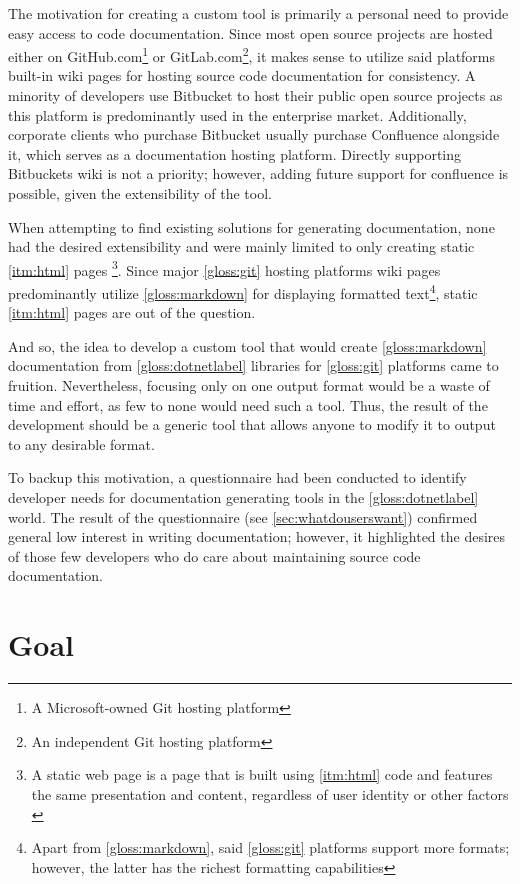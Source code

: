 The motivation for creating a custom tool is primarily a personal need to provide easy access to code documentation. Since most open source projects are hosted either on GitHub.com\footnote{A Microsoft-owned Git hosting platform} or GitLab.com\footnote{An independent Git hosting platform}, it makes sense to utilize said platforms built-in wiki pages for hosting source code documentation for consistency. A minority of developers use Bitbucket to host their public open source projects as this platform is predominantly used in the enterprise market. Additionally, corporate clients who purchase Bitbucket usually purchase Confluence alongside it, which serves as a documentation hosting platform. Directly supporting Bitbuckets wiki is not a priority; however, adding future support for confluence is possible, given the extensibility of the tool.

When attempting to find existing solutions for generating documentation, none had the desired extensibility and were mainly limited to only creating static \ref{itm:html} pages
\footnote{A static web page is a page that is built using \ref{itm:html} code and features the same presentation and content, regardless of user identity or other factors \cite{techopedia_what_2017}}.
Since major \ref{gloss:git} hosting platforms wiki pages predominantly utilize \ref{gloss:markdown} for displaying formatted text\footnote{Apart from \ref{gloss:markdown}, said \ref{gloss:git} platforms support more formats; however, the latter has the richest formatting capabilities}, static \ref{itm:html} pages are out of the question.

And so, the idea to develop a custom tool that would create \ref{gloss:markdown} documentation from \ref{gloss:dotnetlabel} libraries for \ref{gloss:git} platforms came to fruition. Nevertheless, focusing only on one output format would be a waste of time and effort, as few to none would need such a tool. Thus, the result of the development should be a generic tool that allows anyone to modify it to output to any desirable format.

To backup this motivation, a questionnaire had been conducted to identify developer needs for documentation generating tools in the \ref{gloss:dotnetlabel} world. The result of the questionnaire (see \ref{sec:whatdouserswant}) confirmed general low interest in writing documentation; however, it highlighted the desires of those few developers who do care about maintaining source code documentation.

\section*{Goal}

